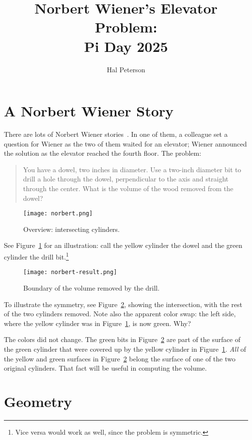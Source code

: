 \documentclass[twocolumn]{article}
\title{Norbert Wiener's Elevator Problem: \\ Pi Day 2025}
\author{Hal Peterson}
\theoremstyle{definition}
\theoremstyle{plain}
\begin{document}
\maketitle

\section{A Norbert Wiener Story}

There are lots of Norbert Wiener stories~\cite{Hardesty2021}.  In one
of them, a colleague 
set a question for Wiener as the two of them waited for an elevator;
Wiener announced the solution as the elevator reached the fourth
floor.  The problem:
\begin{quotation}
  You have a dowel, two inches in diameter.  Use a two-inch diameter
  bit to drill a hole through the dowel, perpendicular to the axis and
  straight through the center.  What is the volume of the wood removed
  from the dowel?
\end{quotation}

\begin{figure}
  \texttt{[image: norbert.png]}
  \caption{Overview:  intersecting cylinders.}
  \label{fig:overview}
\end{figure}

See Figure~\ref{fig:overview} for an illustration:  call the yellow
cylinder the dowel and the green cylinder the drill bit.\footnote{Vice
versa would work as well, since the problem is symmetric.}

\begin{figure}
  \texttt{[image: norbert-result.png]}
  \caption{Boundary of the volume removed by the drill.}
  \label{fig:boundary}
\end{figure}

To illustrate the symmetry, see Figure~\ref{fig:boundary}, showing the
intersection, with the rest of the two cylinders removed.  Note
also the apparent color swap:  the left side, where the yellow
cylinder was in Figure~\ref{fig:overview}, is now green.  Why?

The colors did not change.  The green bits in
Figure~\ref{fig:boundary} are part of the surface of the green
cylinder that were covered up by the yellow cylinder in
Figure~\ref{fig:overview}.  \emph{All} of the yellow and green
surfaces in Figure~\ref{fig:boundary} belong the surface of one of the
two original cylinders.  That fact will be useful in computing the
volume.

\section{Geometry}
\end{document}
